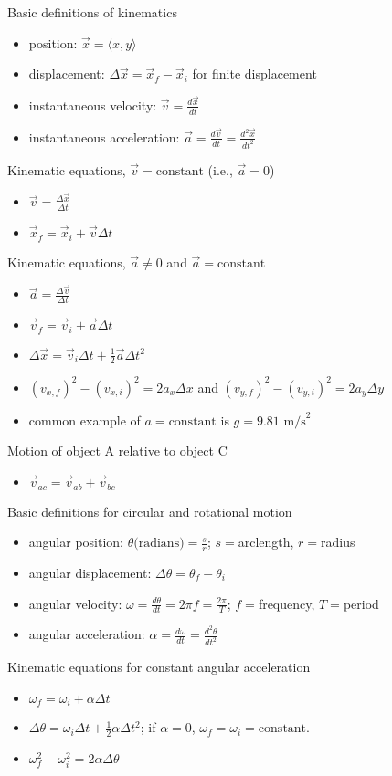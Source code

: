 \documentclass[11pt,letterpaper]{article}
\begin{document}
\noindent Basic definitions of kinematics
\begin{itemize}
\item position: $\vec{x}=\langle{x,y}\rangle$
\item displacement: $\Delta{\vec{x}}=\vec{x}_f-\vec{x}_i$ for finite displacement
\item instantaneous velocity: $\vec{v}=\displaystyle\frac{d\vec{x}}{dt}$
\item instantaneous acceleration: $\vec{a}=\displaystyle\frac{d\vec{v}}{dt}=\displaystyle\frac{d^2\vec{x}}{dt^2}$
\end{itemize}
Kinematic equations, $\vec{v}=\mbox{constant}$ (i.e., $\vec{a}=0$)
\begin{itemize}
\item $\vec{v}=\displaystyle\frac{\Delta{\vec{x}}}{\Delta{t}}$
\item $\vec{x}_f=\vec{x}_i+\vec{v}\Delta{t}$
\end{itemize}
Kinematic equations, $\vec{a}\neq{0}$ and $\vec{a}=\mbox{constant}$
\begin{itemize}
\item $\vec{a}=\displaystyle\frac{\Delta{\vec{v}}}{\Delta{t}}$
\item $\vec{v}_f=\vec{v}_i+\vec{a}\Delta{t}$
\item $\Delta{\vec{x}}=\vec{v}_i\Delta{t}+\displaystyle\frac{1}{2}\vec{a}\Delta{t}^2$
\item $\left(v_{x,f}\right)^2-\left(v_{x,i}\right)^2=2a_x\Delta{x}$ and $\left(v_{y,f}\right)^2-\left(v_{y,i}\right)^2=2a_y\Delta{y}$
\item common example of $a=\mbox{constant}$ is $g=9.81\mbox{ m/s}^2$
\end{itemize}
Motion of object A relative to object C
\begin{itemize}
\item $\vec{v}_{ac}=\vec{v}_{ab}+\vec{v}_{bc}$
\end{itemize}

\noindent Basic definitions for circular and rotational motion
\begin{itemize}
\item angular position: $\theta\mbox{(radians)}=\displaystyle\frac{s}{r}$; $s=$arclength, $r=$radius
\item angular displacement: $\Delta\theta=\theta_f-\theta_i$
\item angular velocity: $\omega=\displaystyle\frac{d\theta}{dt}=2\pi{f}=\displaystyle\frac{2\pi}{T}$; $f=$frequency, $T=$period
\item angular acceleration: $\alpha=\displaystyle\frac{d\omega}{d{t}}=\frac{d^2\theta}{dt^2}$
\end{itemize}
Kinematic equations for constant angular acceleration
\begin{itemize}
\item $\omega_f=\omega_i+\alpha\Delta{t}$
\item $\Delta\theta=\omega_i\Delta{t}+\displaystyle\frac{1}{2}\alpha\Delta{t}^2$; if $\alpha=0$, $\omega_f=\omega_i=\mbox{constant}$.
\item $\omega_f^2-\omega_i^2=2\alpha\Delta{\theta}$
\end{itemize}
\end{document}
